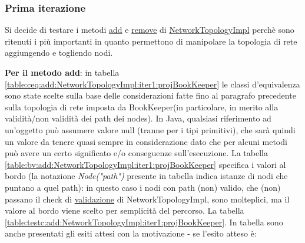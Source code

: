 \documentclass[10pt, a4paper]{article}
\newcommand{\gettablelabel}[5]{table:#1:#2:#3:iter#4:proj#5}
\def\bookkeeper{BookKeeper}
\begin{document}
	\subsubsection{Prima iterazione}
	Si decide di testare i metodi 
	\href{https://bookkeeper.apache.org/docs/latest/api/javadoc/org/apache/bookkeeper/net/NetworkTopologyImpl.html#add(org.apache.bookkeeper.net.Node)}{add} e 
	\href{https://bookkeeper.apache.org/docs/latest/api/javadoc/org/apache/bookkeeper/net/NetworkTopologyImpl.html#remove(org.apache.bookkeeper.net.Node)}{remove}
	di \href{https://bookkeeper.apache.org/docs/latest/api/javadoc/org/apache/bookkeeper/net/NetworkTopologyImpl.html}{NetworkTopologyImpl} 
	perchè sono ritenuti i più importanti in quanto permettono di manipolare la topologia di rete aggiungendo e togliendo nodi.
	
	\textbf{Per il metodo add}: in tabella 
	\ref{\gettablelabel{ceq}{add}{NetworkTopologyImpl}{1}{\bookkeeper}}
	le classi d'equivalenza sono state scelte sulla base delle considerazioni fatte fino al paragrafo
	precedente sulla topologia di rete imposta da \bookkeeper\;(in particolare, in merito alla validità/non
	validità dei path dei nodes). In Java, qualsiasi riferimento ad
	un'oggetto può assumere valore null (tranne per i tipi primitivi), 
	che sarà quindi un valore da tenere quasi sempre in 
	considerazione dato che per alcuni metodi può avere un certo significato e/o conseguenze 
	sull'esecuzione. La tabella \ref{\gettablelabel{bv}{add}{NetworkTopologyImpl}{1}
	{\bookkeeper}} specifica i valori al bordo (la notazione \textit{Node("path")} presente in tabella indica
	istanze di nodi che puntano a quel path): in questo caso i nodi con path (non) valido, che (non) 
	passano il check di \underline{validazione} di NetworkTopologyImpl, sono molteplici, ma il valore al 
	bordo viene scelto per semplicità del percorso. 
	La tabella \ref{\gettablelabel{testc}{add}{NetworkTopologyImpl}{1}{\bookkeeper}}. 
	In tabella sono anche presentati
	gli esiti attesi con la motivazione - se l'esito atteso è:
\end{document}
